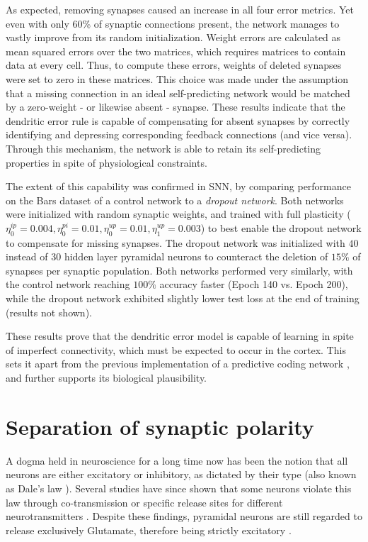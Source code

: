 As expected, removing synapses caused an increase in all four error metrics. Yet even with only 60\% of synaptic
connections present, the network manages to vastly improve from its random initialization. Weight errors are calculated
as mean squared errors over the two matrices, which requires matrices to contain data at every cell. Thus, to compute
these errors, weights of deleted synapses were set to zero in these matrices. This choice was made under the assumption
that a missing connection in an ideal self-predicting network would be matched by a zero-weight - or likewise absent -
synapse. These results indicate that the dendritic error rule is capable of compensating for absent synapses by
correctly identifying and depressing corresponding feedback connections (and vice versa). Through this mechanism, the
network is able to retain its self-predicting properties in spite of physiological constraints.


The extent of this capability was confirmed in SNN, by comparing performance on the Bars dataset of a control network to
a \textit{dropout network}. Both networks were initialized with random synaptic weights, and trained with full
plasticity ($\eta^{ip}_0 = 0.004, \eta^{pi}_0 = 0.01, \eta^{up}_0 = 0.01, \eta^{up}_1 = 0.003$) to best enable the
dropout network to compensate for missing synapses. The dropout network was initialized with $40$ instead of $30$ hidden
layer pyramidal neurons to counteract the deletion of $15\%$ of synapses per synaptic population. Both networks
performed very similarly, with the control network reaching $100\%$ accuracy faster (Epoch 140 vs. Epoch 200), while the
dropout network exhibited slightly lower test loss at the end of training (results not shown).

These results prove that the dendritic error model is capable of learning in spite of imperfect connectivity, which must
be expected to occur in the cortex. This sets it apart from the previous implementation of a predictive coding network
\citep{Whittington2017}, and further supports its biological plausibility.



\section{Separation of synaptic polarity}


A dogma held in neuroscience for a long time now has been the notion that all neurons are either excitatory or
inhibitory, as dictated by their type (also known as Dale's law \citep{Kandel1968}). Several studies have since shown
that some neurons violate this law through co-transmission or specific release sites for different neurotransmitters
\citep{Svensson2019,Barranca2022}. Despite these findings, pyramidal neurons are still regarded to release exclusively
Glutamate, therefore being strictly excitatory \citep{gerfen2018long,spruston2008pyramidal,Eyal2018}.



